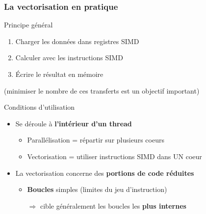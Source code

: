 \documentclass[xcolor={x11names,svgnames}]{beamer}
\begin{document}
\begin{frame}
  \frametitle{La vectorisation en pratique}

  \begin{block}{Principe général}
    \begin{enumerate}
    \item Charger les données dans registres SIMD
    \item Calculer avec les instructions SIMD
    \item Écrire le résultat en mémoire
    \end{enumerate}
  \end{block}

  (minimiser le nombre de ces transferts est un objectif important)
  
  \begin{alertblock}{Conditions d'utilisation}
    \begin{itemize}
    \item Se déroule à \textbf{l'intérieur d'un thread}
      \begin{itemize}
      \item Parallélisation = répartir sur plusieurs coeurs
      \item Vectorisation = utiliser instructions SIMD dans UN coeur
      \end{itemize}
    \item La vectorisation concerne des \textbf{portions de code réduites}
      \begin{itemize}
      \item \textbf{Boucles} simples (limites du jeu d'instruction) 
      \item [$\Rightarrow$] cible généralement les boucles les \textbf{plus internes}
      \end{itemize}

    \end{itemize}
  \end{alertblock}
\end{frame}  

\end{document}
